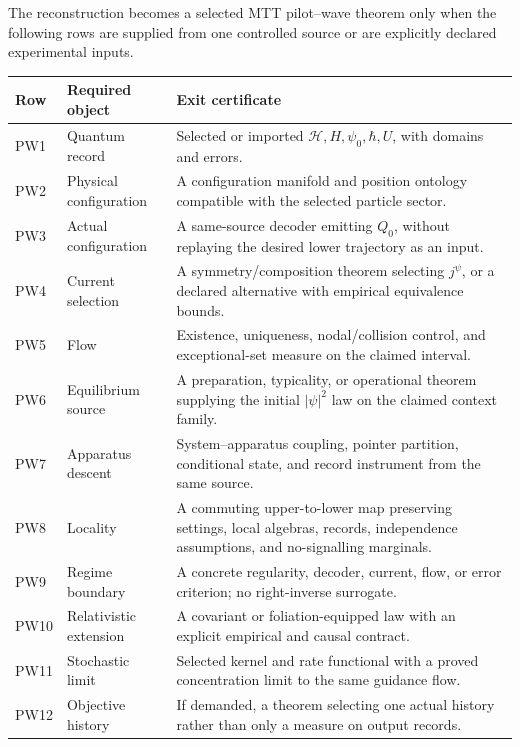 \documentclass[11pt]{article}
\theoremstyle{definition}
\theoremstyle{remark}
\newcommand{\cH}{\mathcal H}
\begin{document}
The reconstruction becomes a selected MTT pilot--wave theorem only when the
following rows are supplied from one controlled source or are explicitly
declared experimental inputs.

\begin{center}
\small
\begin{tabularx}{\textwidth}{@{}p{}p{}X@{}}
\toprule
Row & Required object & Exit certificate \\
\midrule
PW1 & Quantum record
& Selected or imported \(\cH,H,\psi_0,\hbar,U\), with domains and errors. \\
PW2 & Physical configuration
& A configuration manifold and position ontology compatible with the
  selected particle sector. \\
PW3 & Actual configuration
& A same-source decoder emitting \(Q_0\), without replaying the desired
  lower trajectory as an input. \\
PW4 & Current selection
& A symmetry/composition theorem selecting \(j^\psi\), or a declared
  alternative with empirical equivalence bounds. \\
PW5 & Flow
& Existence, uniqueness, nodal/collision control, and exceptional-set
  measure on the claimed interval. \\
PW6 & Equilibrium source
& A preparation, typicality, or operational theorem supplying the initial
  \(|\psi|^2\) law on the claimed context family. \\
PW7 & Apparatus descent
& System--apparatus coupling, pointer partition, conditional state, and
  record instrument from the same source. \\
PW8 & Locality
& A commuting upper-to-lower map preserving settings, local algebras,
  records, independence assumptions, and no-signalling marginals. \\
PW9 & Regime boundary
& A concrete regularity, decoder, current, flow, or error criterion; no
  right-inverse surrogate. \\
PW10 & Relativistic extension
& A covariant or foliation-equipped law with an explicit empirical and
  causal contract. \\
PW11 & Stochastic limit
& Selected kernel and rate functional with a proved concentration limit to
  the same guidance flow. \\
PW12 & Objective history
& If demanded, a theorem selecting one actual history rather than only a
  measure on output records. \\
\bottomrule
\end{tabularx}
\end{center}
\end{document}

